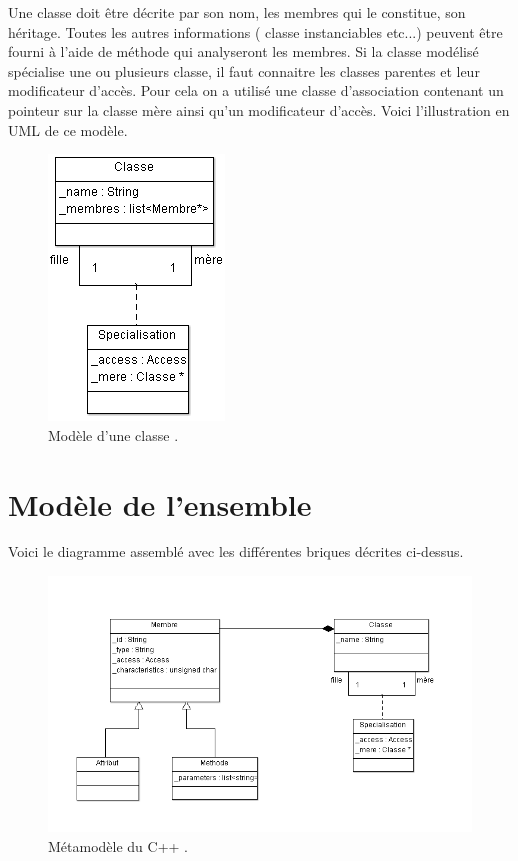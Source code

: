 \documentclass[a4paper,11pt]{report}
\begin{document}
\normalsize{
Une classe doit être décrite par son nom, les membres qui le constitue, son héritage. Toutes les autres informations ( classe instanciables etc...) peuvent être fourni à l'aide de méthode qui analyseront les membres. Si la classe modélisé spécialise une ou plusieurs classe, il faut connaitre les classes parentes et leur modificateur d'accès. Pour cela on a utilisé une classe d'association contenant un pointeur sur la classe mère ainsi qu'un modificateur d'accès. Voici l'illustration en UML de ce modèle.
}

\clearpage

\begin{figure}[!h]
   \begin{center}
   \includegraphics[scale = 0.9]{ModeleClasse.PNG}
   \end{center}
  \caption{Modèle d'une classe .}
\end{figure}


\section{Modèle de l'ensemble}

\normalsize
{
Voici le diagramme assemblé avec les différentes briques décrites ci-dessus.
}

\begin{figure}[!h]
   \begin{center}
   \includegraphics[scale = 0.65]{metamodeleCpp.PNG}
   \end{center}
  \caption{Métamodèle du C++ .}
\end{figure}
\end{document}
